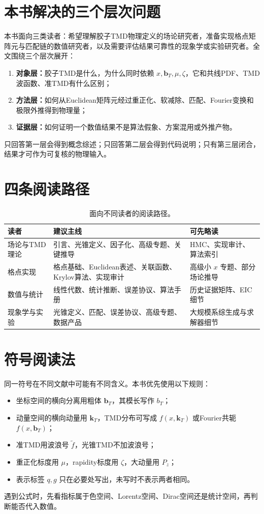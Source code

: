 \documentclass[UTF8,12pt,a4paper,twoside,openany]{ctexbook}
\newcommand{\bT}{\boldsymbol b_T}
\newcommand{\kT}{\boldsymbol k_T}
\begin{document}
\section*{本书解决的三个层次问题}

本书面向三类读者：希望理解胶子TMD物理定义的场论研究者，准备实现格点矩阵元与匹配链的数值研究者，以及需要评估结果可靠性的现象学或实验研究者。全文围绕三个层次展开：
\begin{enumerate}
  \item \textbf{对象层：}胶子TMD是什么，为什么同时依赖 \(x,\bT,\mu,\zeta\)，它和共线PDF、TMD波函数、准TMD有什么区别；
  \item \textbf{方法层：}如何从Euclidean矩阵元经过重正化、软减除、匹配、Fourier变换和极限外推得到物理量；
  \item \textbf{证据层：}如何证明一个数值结果不是算法假象、方案混用或外推产物。
\end{enumerate}
只回答第一层会得到概念综述；只回答第二层会得到代码说明；只有第三层闭合，结果才可作为可复核的物理输入。

\section*{四条阅读路径}

\begin{table}[htbp]
\centering
\caption{面向不同读者的阅读路径。}
\label{tab:reading-paths}
\small
\begin{tabularx}{\textwidth}{L{2.6cm}L{3.6cm}Y}
\toprule
读者 & 建议主线 & 可先略读 \\
\midrule
场论与TMD理论 & 引言、光锥定义、因子化、高级专题、关键推导 & HMC、实现审计、算法索引 \\
格点实现 & 格点基础、Euclidean表述、关联函数、Krylov算法、实现审计 & 高级小 \(x\) 专题、部分场论推导 \\
数值与统计 & 线性代数、统计推断、误差协议、算法手册 & 历史证据矩阵、EIC细节 \\
现象学与实验 & 光锥定义、匹配、误差协议、高级专题、数据产品 & 大规模系综生成与求解器细节 \\
\bottomrule
\end{tabularx}
\end{table}

\section*{符号阅读法}

同一符号在不同文献中可能有不同含义。本书优先使用以下规则：
\begin{itemize}
  \item 坐标空间的横向分离用粗体 \(\bT\)，其模长写作 \(b_T\)；
  \item 动量空间的横向动量用 \(\kT\)，TMD分布可写成 \(f(x,\kT)\) 或Fourier共轭 \(f(x,\bT)\)；
  \item 准TMD用波浪号 \(\widetilde f\)，光锥TMD不加波浪号；
  \item 重正化标度用 \(\mu\)，rapidity标度用 \(\zeta\)，大动量用 \(P_z\)；
  \item 表示标签 \(q,g\) 只在必要处写出，未写时不表示两者相同。
\end{itemize}
遇到公式时，先看指标属于色空间、Lorentz空间、Dirac空间还是统计空间，再判断能否代入数值。
\end{document}
